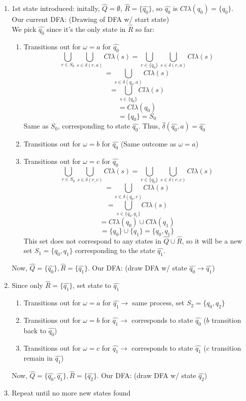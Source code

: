 \documentclass{article}
\begin{document}
\begin{enumerate}
    \item 1st state introduced: initally, $\hat{Q}=\emptyset$, $\hat{R}=\{\hat{q_0}\}$, so $\hat{q_0}$ is $Cl\lambda(q_0)=\{q_0\}$. \\
    Our current DFA: (Drawing of DFA w/ start state) \\
    We pick $\hat{q_0}$ since it's the only state in $\hat{R}$ so far:
    \begin{enumerate}
        \item Transitions out for $\omega=a$ for $\hat{q_0}$
        $$\bigcup_{r\in S_0}\bigcup_{s\in\delta(r,a)}Cl\lambda(s)=\bigcup_{r\in \{q_0\}}\bigcup_{s\in\delta(r,a)}Cl\lambda(s)$$ 
        $$=\bigcup_{s\in\delta(q_0,a)}Cl\lambda(s)$$
        $$=\bigcup_{s\in\{q_0\}}Cl\lambda(s)$$
        $$=Cl\lambda(q_0)$$
        $$=\{q_0\} = S_0$$
        Same as $S_0$, corresponding to state $\hat{q_0}$. Thus, $\hat{\delta}(\hat{q_0},a)=\hat{q_0}$
        \item Transitions out for $\omega=b$ for $\hat{q_0}$ (Same outcome as $\omega=a$)
        \item Transitions out for $\omega=c$ for $\hat{q_0}$
        $$\bigcup_{r\in S_0}\bigcup_{s\in\delta(r,c)}Cl\lambda(s)=\bigcup_{r\in \{q_0\}}\bigcup_{s\in\delta(r,c)}Cl\lambda(s)$$ 
        $$=\bigcup_{s\in\delta(q_0,c)}Cl\lambda(s)$$
        $$=\bigcup_{s\in\{q_0,q_1\}}Cl\lambda(s)$$
        $$=Cl\lambda(q_0)\cup Cl\lambda(q_1)$$
        $$=\{q_0\}\cup\{q_1\}=\{q_0,q_1\}$$
        This set does not correspond to any states in $\hat{Q}\cup\hat{R}$, so it will be a new set $S_1=\{q_0,q_1\}$ corresponding to the state
        $\hat{q_1}$.
    \end{enumerate}
    Now, $\hat{Q}=\{\hat{q_0}\},\hat{R}=\{\hat{q_1}\}$. Our DFA: (draw DFA w/ state $\hat{q_0}\rightarrow\hat{q_1}$)
    \item Since only $\hat{R}=\{\hat{q_1}\}$, set state to $\hat{q_1}$
    \begin{enumerate}
        \item Transitions out for $\omega=a$ for $\hat{q_1}\rightarrow$ same process, set $S_2=\{q_0,q_2\}$
        \item Transitions out for $\omega=b$ for $\hat{q_1}\rightarrow$ corresponds to state $\hat{q_0}$ ($b$ transition back to $\hat{q_0}$)
        \item Transitions out for $\omega=c$ for $\hat{q_1}\rightarrow$ corresponds to state $\hat{q_1}$ ($c$ transition remain in $\hat{q_1}$)
    \end{enumerate}
    Now, $\hat{Q}=\{\hat{q_0},\hat{q_1}\},\hat{R}=\{\hat{q_2}\}$. Our DFA: (draw DFA w/ state $\hat{q_2}$)
    \item Repeat until no more new states found
\end{enumerate}
\end{document}
